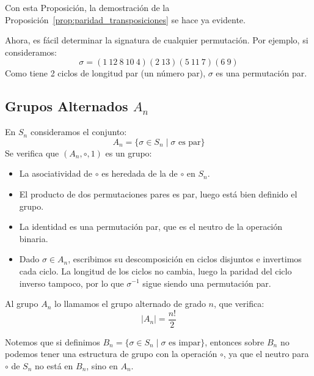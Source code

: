 \noindent
Con esta Proposición, la demostración de la Proposición~\ref{prop:paridad_transposiciones} se hace ya evidente.

\begin{ejemplo}
    Ahora, es fácil determinar la signatura de cualquier permutación. Por ejemplo, si consideramos:
    \begin{equation*}
        \sigma = (1\ 12\ 8\ 10\ 4)(2\ 13)(5\ 11\ 7)(6\ 9)
    \end{equation*}
    Como tiene 2 ciclos de longitud par (un número par), $\sigma$ es una permutación par.
\end{ejemplo}

\subsection{Grupos Alternados $A_n$}
\begin{definicion}
    En $S_n$ consideramos el conjunto:
    \begin{equation*}
        A_n = \{\sigma\in S_n \mid \sigma \text{\ es par}\}
    \end{equation*}
    Se verifica que $(A_n,\circ,1)$ es un grupo:
    \begin{itemize}
        \item La asociatividad de $\circ$ es heredada de la de $\circ$ en $S_n$.
        \item El producto de dos permutaciones pares es par, luego está bien definido el grupo.
        \item La identidad es una permutación par, que es el neutro de la operación binaria.
        \item Dado $\sigma\in A_n$, escribimos su descomposición en ciclos disjuntos e invertimos cada ciclo. La longitud de los ciclos no cambia, luego la paridad del ciclo inverso tampoco, por lo que $\sigma^{-1}$ sigue siendo una permutación par.
    \end{itemize}
    Al grupo $A_n$ lo llamamos el grupo alternado de grado $n$, que verifica:
    \begin{equation*}
        |A_n| = \dfrac{n!}{2}
    \end{equation*}
\end{definicion}


\begin{observacion}
    Notemos que si definimos $B_n = \{\sigma\in S_n \mid \sigma \text{\ es impar}\}$, entonces sobre $B_n$ no podemos tener una estructura de grupo con la operación $\circ$, ya que el neutro para $\circ$ de $S_n$ no está en $B_n$, sino en $A_n$.
\end{observacion}

